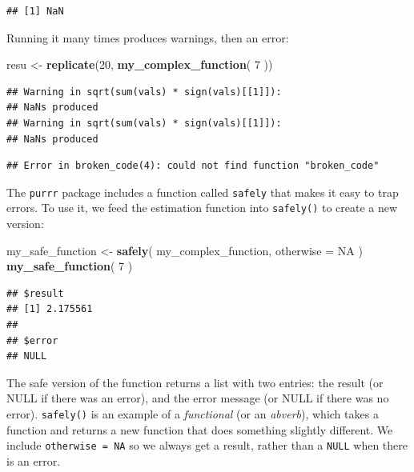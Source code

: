 \documentclass[
]{book}
\newenvironment{Shaded}{\begin{snugshade}}{\end{snugshade}}
\newcommand{\AttributeTok}[1]{\textcolor[rgb]{0.13,0.29,0.53}{#1}}
\newcommand{\ConstantTok}[1]{\textcolor[rgb]{0.56,0.35,0.01}{#1}}
\newcommand{\DecValTok}[1]{\textcolor[rgb]{0.00,0.00,0.81}{#1}}
\newcommand{\FunctionTok}[1]{\textcolor[rgb]{0.13,0.29,0.53}{\textbf{#1}}}
\newcommand{\NormalTok}[1]{#1}
\newcommand{\OtherTok}[1]{\textcolor[rgb]{0.56,0.35,0.01}{#1}}
\begin{document}
\begin{verbatim}
## [1] NaN
\end{verbatim}

Running it many times produces warnings, then an error:

\begin{Shaded}
\begin{Highlighting}[]
\NormalTok{resu }\OtherTok{\textless{}{-}} \FunctionTok{replicate}\NormalTok{(}\DecValTok{20}\NormalTok{, }\FunctionTok{my\_complex\_function}\NormalTok{( }\DecValTok{7}\NormalTok{ ))}
\end{Highlighting}
\end{Shaded}

\begin{verbatim}
## Warning in sqrt(sum(vals) * sign(vals)[[1]]):
## NaNs produced
## Warning in sqrt(sum(vals) * sign(vals)[[1]]):
## NaNs produced
\end{verbatim}

\begin{verbatim}
## Error in broken_code(4): could not find function "broken_code"
\end{verbatim}

The \texttt{purrr} package includes a function called \texttt{safely} that makes it easy to trap errors.
To use it, we feed the estimation function into \texttt{safely()} to create a new version:

\begin{Shaded}
\begin{Highlighting}[]
\NormalTok{my\_safe\_function }\OtherTok{\textless{}{-}} \FunctionTok{safely}\NormalTok{( my\_complex\_function, }\AttributeTok{otherwise =} \ConstantTok{NA}\NormalTok{ )}
\FunctionTok{my\_safe\_function}\NormalTok{( }\DecValTok{7}\NormalTok{ )}
\end{Highlighting}
\end{Shaded}

\begin{verbatim}
## $result
## [1] 2.175561
## 
## $error
## NULL
\end{verbatim}

The safe version of the function returns a list with two entries: the result (or NULL if there was an error), and the error message (or NULL if there was no error).
\texttt{safely()} is an example of a \emph{functional} (or an \emph{abverb}), which takes a function and returns a new function that does something slightly different.
We include \texttt{otherwise\ =\ NA} so we always get a result, rather than a \texttt{NULL} when there is an error.
\end{document}

